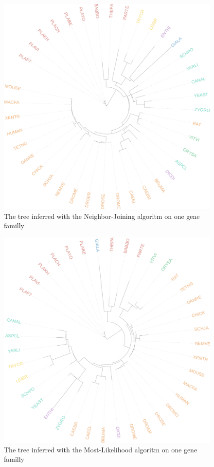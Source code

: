 \documentclass[]{article}
\theoremstyle{definition}
\begin{document}
\begin{figure}[H]
	\includegraphics*[width = \linewidth]{image/Nj_ex2.pdf}
	\caption{ The tree inferred with the Neighbor-Joining algoritm on one gene familly }
\end{figure}

\begin{figure}[H]
	\includegraphics*[width = \linewidth]{image/Ml_ex2.pdf}
	\caption{ The tree inferred with the Most-Likelihood algoritm on one gene familly}
\end{figure}
\end{document}
